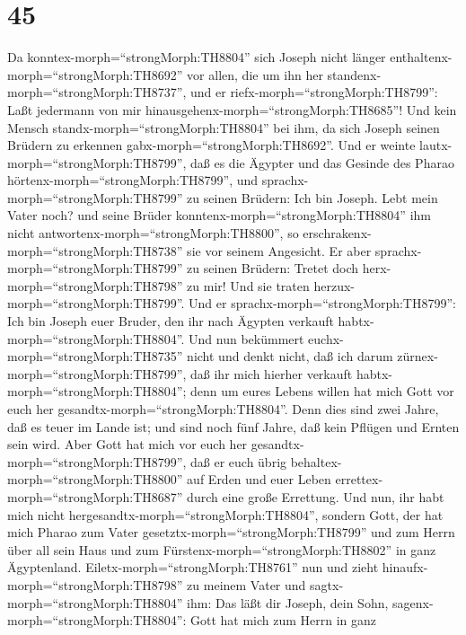 \hypertarget{section-44}{%
\section{45}\label{section-44}}

 Da konntex-morph=``strongMorph:TH8804'' sich Joseph nicht
länger enthaltenx-morph=``strongMorph:TH8692'' vor allen, die um ihn her
standenx-morph=``strongMorph:TH8737'', und er
riefx-morph=``strongMorph:TH8799'': Laßt jedermann von mir
hinausgehenx-morph=``strongMorph:TH8685''! Und kein Mensch
standx-morph=``strongMorph:TH8804'' bei ihm, da sich Joseph seinen
Brüdern zu erkennen gabx-morph=``strongMorph:TH8692''.  Und
er weinte lautx-morph=``strongMorph:TH8799'', daß es die Ägypter und das
Gesinde des Pharao hörtenx-morph=``strongMorph:TH8799'', 
und sprachx-morph=``strongMorph:TH8799'' zu seinen Brüdern: Ich bin
Joseph. Lebt mein Vater noch? und seine Brüder
konntenx-morph=``strongMorph:TH8804'' ihm nicht
antwortenx-morph=``strongMorph:TH8800'', so
erschrakenx-morph=``strongMorph:TH8738'' sie vor seinem Angesicht.
 Er aber sprachx-morph=``strongMorph:TH8799'' zu seinen
Brüdern: Tretet doch herx-morph=``strongMorph:TH8798'' zu mir! Und sie
traten herzux-morph=``strongMorph:TH8799''. Und er
sprachx-morph=``strongMorph:TH8799'': Ich bin Joseph euer Bruder, den
ihr nach Ägypten verkauft habtx-morph=``strongMorph:TH8804''.
 Und nun bekümmert euchx-morph=``strongMorph:TH8735'' nicht
und denkt nicht, daß ich darum zürnex-morph=``strongMorph:TH8799'', daß
ihr mich hierher verkauft habtx-morph=``strongMorph:TH8804''; denn um
eures Lebens willen hat mich Gott vor euch her
gesandtx-morph=``strongMorph:TH8804''.  Denn dies sind zwei
Jahre, daß es teuer im Lande ist; und sind noch fünf Jahre, daß kein
Pflügen und Ernten sein wird.  Aber Gott hat mich vor euch
her gesandtx-morph=``strongMorph:TH8799'', daß er euch übrig
behaltex-morph=``strongMorph:TH8800'' auf Erden und euer Leben
errettex-morph=``strongMorph:TH8687'' durch eine große Errettung.
 Und nun, ihr habt mich nicht
hergesandtx-morph=``strongMorph:TH8804'', sondern Gott, der hat mich
Pharao zum Vater gesetztx-morph=``strongMorph:TH8799'' und zum Herrn
über all sein Haus und zum Fürstenx-morph=``strongMorph:TH8802'' in ganz
Ägyptenland.  Eiletx-morph=``strongMorph:TH8761'' nun und
zieht hinaufx-morph=``strongMorph:TH8798'' zu meinem Vater und
sagtx-morph=``strongMorph:TH8804'' ihm: Das läßt dir Joseph, dein Sohn,
sagenx-morph=``strongMorph:TH8804'': Gott hat mich zum Herrn in ganz
